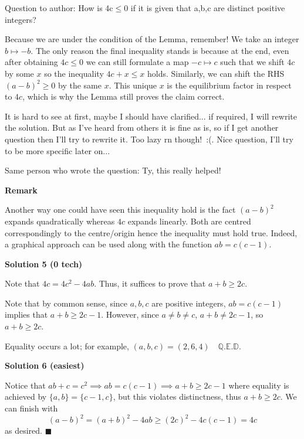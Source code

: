 \begin{enumerate}
 Question to author: How is 4c$\leq$0 if it is given that a,b,c are distinct positive integers?

 Because we are under the condition of the Lemma, remember! We take an integer $b \mapsto -b$. The only reason the final inequality stands is because at the end, even after obtaining $4c \leq 0$ we can still formulate a map $-c \mapsto c$ such that we shift $4c$ by some $x$ so the inequality $4c +x \leq x$ holds. Similarly, we can shift the RHS $(a-b)^2 \geq 0$ by the same $x$. This unique $x$ is the equilibrium factor in respect to $4c$, which is why the Lemma still proves the claim correct.

 It is hard to see at first, maybe I should have clarified... if required, I will rewrite the solution. But as I've heard from others it is fine as is, so if I get another question then I'll try to rewrite it. Too lazy rn though! :(. Nice question, I'll try to be more specific later on...

 Same person who wrote the question: Ty, this really helped!

 \textbf{Remark}

 Another way one could have seen this inequality hold is the fact $(a-b)^2$ expands quadratically whereas $4c$ expands linearly. Both are centred correspondingly to the centre/origin  hence the inequality must hold true. Indeed, a graphical approach can be used along with the function $ab = c(c-1)$.

 



\textbf{Solution 5 (0 tech)}

Note that $4c = 4c^2-4ab$. Thus, it suffices to prove that $a+b \ge 2c$. 

 Note that by common sense, since $a, b, c$ are positive integers, $ab = c(c-1)$ implies that $a + b \ge 2c-1$. However, since $a \ne b \ne c$, $a+b \ne 2c-1$, so $a+b \ge 2c$. 

 Equality occurs a lot; for example, $(a, b, c) = (2, 6, 4) \quad \mathbb{Q.E.D}$.

 



\textbf{Solution 6 (easiest)}

Notice that $ab+c=c^2 \implies ab=c(c-1) \implies a+b \geq 2c-1$ where equality is achieved by $\{a,b\}=\{c-1,c\}$, but this violates distinctness, thus $a+b \ge 2c$. We can finish with 
 \[(a-b)^2 = (a+b)^2 - 4ab \ge (2c)^2 - 4c(c-1) = 4c\]as desired. $\blacksquare$




\end{enumerate}
